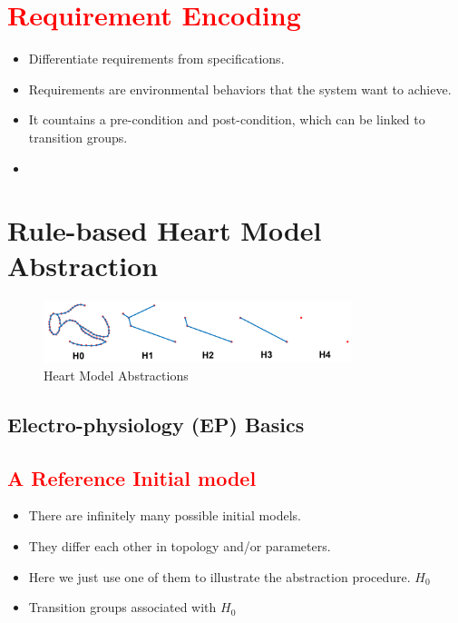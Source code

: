 \documentclass{llncs}
\begin{document}
\section{\textcolor{red}{Requirement Encoding}}
\begin{itemize}
	\item Differentiate requirements from specifications.
    \item Requirements are environmental behaviors that the system want to achieve.
    \item It countains a pre-condition and post-condition, which can be linked to transition groups.
    \item 
\end{itemize}



\section{Rule-based Heart Model Abstraction}
\begin{figure}[!t]
		\centering
		\includegraphics[width=0.8\textwidth]{figs/HMs.png}
		\caption{\small Heart Model Abstractions}
		\label{fig:abs}
\end{figure}
\subsection{Electro-physiology (EP) Basics}
\subsection{\textcolor{red}{A Reference Initial model}}
\begin{itemize}
	\item There are infinitely many possible initial models.
    \item They differ each other in topology and/or parameters.
    \item Here we just use one of them to illustrate the abstraction procedure. $H_0$
    \item Transition groups associated with $H_0$
\end{itemize}
\end{document}
